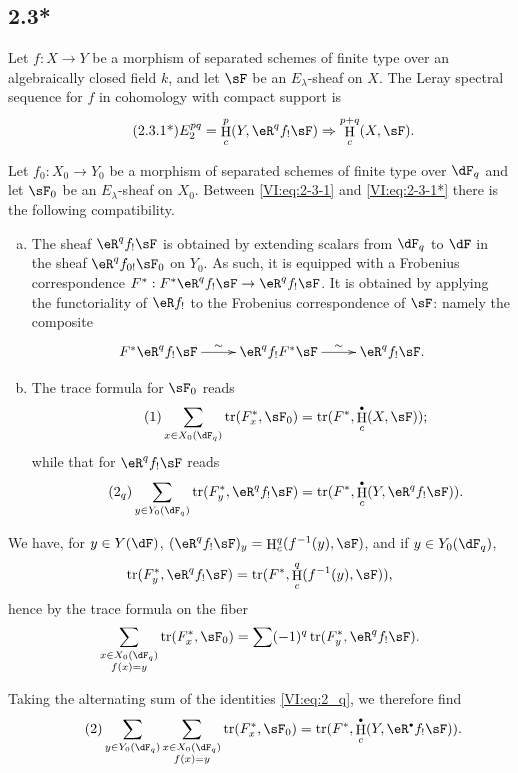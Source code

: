 \documentclass[oneside]{book}
\DeclareMathOperator{\h}{H}
\DeclareMathOperator{\tr}{tr}
\theoremstyle{sga-source}
\theoremstyle{sga-source-dash}
\theoremstyle{sga-source-dotdash}
\theoremstyle{sga-source-number-note-dash}
\theoremstyle{sga-source-note-number-dotdash}
\theoremstyle{sga-source-example-dotdash}
\theoremstyle{sga-source-inline-number}
\theoremstyle{sga-source-bare-number}
\theoremstyle{sga-source}
\let\oldbullet\bullet
\renewcommand{\bullet}{\textnormal{\tiny$\oldbullet$}}
\newcommand{\PrintPage}[1]{}\newcommand{\MathPage}[1]{}\newcommand{\PrintCite}[2]{#1}\newcommand{\var}[3]{#2}
\begin{document}
\PrintPage{184}
\subsection*{2.3*}\label{VI:2-3*}

Let $f:X\to Y$ be a morphism of separated schemes of finite type over an 
algebraically closed field $k$, and let $\sF$ be an $E_\lambda$-sheaf on $X$. The 
Leray spectral sequence for $f$ in cohomology with compact support is 
\begin{align*}\tag{2.3.1*}\label{VI:eq:2-3-1*}
  E_2^{p q} = \h_c^p(Y,\eR^q f_! \sF) \Rightarrow \h_c^{p+q}(X,\sF) \text{.}
\end{align*}

Let $f_0:X_0 \to Y_0$ be a morphism of separated schemes of finite type over 
$\dF_q$ and let $\sF_0$ be an $E_\lambda$-sheaf on $X_0$. Between 
\eqref{VI:eq:2-3-1} and \eqref{VI:eq:2-3-1*} there is the following compatibility. 

\begin{enumerate}[a)]
  \item The sheaf $\eR^q f_! \sF$ is obtained by extending scalars from 
    $\dF_q$ to $\dF$ in the sheaf $\eR^q f_{0!} \sF_0$ on $Y_0$. As 
    such, it is equipped with a Frobenius correspondence 
    $F^\ast:F^\ast\eR^q f_! \sF \to \eR^q f_! \sF$. It is obtained by applying 
    the functoriality of $\eR f_!$ to the Frobenius correspondence of $\sF$: 
    namely the composite 
    \[\xymatrix{
      F^\ast \eR^q f_! \sF \ar[r]^-\sim 
        & \eR^q f_! F^\ast \sF \ar[r]^-\sim 
        & \eR^q f_! \sF \text{.}
    }\]
  \item The trace formula for $\sF_0$ reads 
    \begin{align*}\tag{1}\label{VI:eq:1}
      \sum_{x\in X_0(\dF_q)} \tr(F_x^\ast,\sF_0) = \var{\tr(F^\ast,\h^\bullet(X,\sF))}{\tr(F^\ast,\h_c^\bullet(X,\sF))}{S45-SOL-0736} \text{;}
    \end{align*}
    while that for $\eR^q f_! \sF$ reads 
    \begin{align*}\tag{2$_q$}\label{VI:eq:2_q} 
      \sum_{y\in Y_0(\dF_q)} \tr(F_y^\ast,\eR^q f_! \sF) = \var{\tr(F^\ast, \h^\bullet(Y,\eR^q f_! \sF))}{\tr(F^\ast,\h_c^\bullet(Y,\eR^q f_! \sF))}{S45-SOL-0737} \text{.}
    \end{align*}
\end{enumerate}

We have, for $y\in Y(\dF)$, $(\eR^q f_! \sF)_y = \h_c^q(f^{-1}(y),\sF)$, and if 
$y\in Y_0(\dF_q)$, 
\[
  \tr(F_y^\ast,\eR^q f_! \sF) = \tr(F^\ast,\h_c^q(f^{-1}(y),\sF)) \text{,}
\]
hence by the trace formula on the fiber 
\[
  \sum_{\substack{x\in X_0(\dF_q) \\ f(x) = y}} \tr(F_x^\ast,\sF_0) = \sum (-1)^q \tr(F_y^\ast,\eR^q f_! \sF) \text{.}
\]
\PrintPage{185}
Taking the alternating sum of the identities \eqref{VI:eq:2_q}, we therefore find 
\begin{align*}\tag{2}\label{VI:eq:2}
  \sum_{y\in Y_0(\dF_q)} \sum_{\substack{x \in X_0(\dF_q) \\ f(x) = y}} \tr(F_x^\ast,\sF_0) = \var{\tr(F^\ast,\h^\bullet(Y,\eR^\bullet f_! \sF))}{\tr(F^\ast,\h_c^\bullet(Y,\eR^\bullet f_! \sF))}{S45-SOL-0738} \text{.}
\end{align*}
\end{document}
